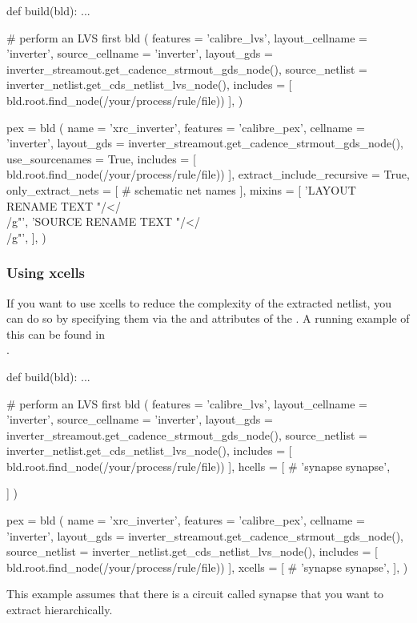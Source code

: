\begin{lstwscript}
def build(bld):
    ...

    # perform an LVS first
    bld (
        features = 'calibre_lvs',
        layout_cellname = 'inverter',
        source_cellname = 'inverter',
        layout_gds = inverter_streamout.get_cadence_strmout_gds_node(),
        source_netlist = inverter_netlist.get_cds_netlist_lvs_node(),
        includes = [
            bld.root.find_node(/your/process/rule/file))
        ],
    )

    pex = bld (
        name = 'xrc_inverter',
        features = 'calibre_pex',
        cellname = 'inverter',
        layout_gds = inverter_streamout.get_cadence_strmout_gds_node(),
        use_sourcenames = True,
        includes = [
            bld.root.find_node(/your/process/rule/file))
        ],
        extract_include_recursive = True,
        only_extract_nets = [
            # schematic net names
        ],
        mixins = [
            'LAYOUT RENAME TEXT "/</\\[/g" "/>/\\]/g"',
            'SOURCE RENAME TEXT "/</\\[/g" "/>/\\]/g"',
        ],
    )
\end{lstwscript}
\subsubsection{Using xcells}
If you want to use xcells to reduce the complexity of the extracted netlist,
you can do so by specifying them via the  and  attributes
of the .
A running example of this can be found in\\
.

\begin{lstwscript}
def build(bld):
    ...

    # perform an LVS first
    bld (
        features = 'calibre_lvs',
        layout_cellname = 'inverter',
        source_cellname = 'inverter',
        layout_gds = inverter_streamout.get_cadence_strmout_gds_node(),
        source_netlist = inverter_netlist.get_cds_netlist_lvs_node(),
        includes = [
            bld.root.find_node(/your/process/rule/file))
        ],
        hcells = [
            #        'synapse synapse',

        ]
    )

    pex = bld (
        name = 'xrc_inverter',
        features = 'calibre_pex',
        cellname = 'inverter',
        layout_gds = inverter_streamout.get_cadence_strmout_gds_node(),
        source_netlist = inverter_netlist.get_cds_netlist_lvs_node(),
        includes = [
            bld.root.find_node(/your/process/rule/file))
        ],
        xcells = [
            #        'synapse synapse',
        ],
    )
\end{lstwscript}

This example assumes that there is a circuit called synapse that you want to
extract hierarchically.
